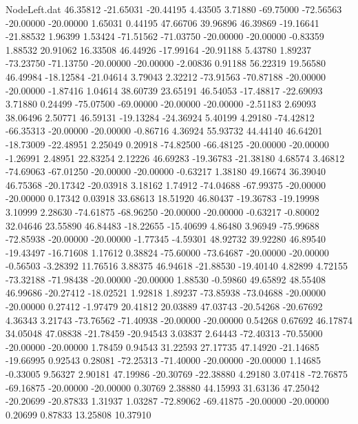 \begin{filecontents}{NodeLeft.dat}
  46.35812  -21.65031  -20.44195     4.43505    3.71880  -69.75000  -72.56563  -20.00000  -20.00000    1.65031    0.44195   47.66706   39.96896
  46.39869  -19.16641  -21.88532     1.96399    1.53424  -71.51562  -71.03750  -20.00000  -20.00000   -0.83359    1.88532   20.91062   16.33508
  46.44926  -17.99164  -20.91188     5.43780    1.89237  -73.23750  -71.13750  -20.00000  -20.00000   -2.00836    0.91188   56.22319   19.56580
  46.49984  -18.12584  -21.04614     3.79043    2.32212  -73.91563  -70.87188  -20.00000  -20.00000   -1.87416    1.04614   38.60739   23.65191
  46.54053  -17.48817  -22.69093     3.71880    0.24499  -75.07500  -69.00000  -20.00000  -20.00000   -2.51183    2.69093   38.06496    2.50771
  46.59131  -19.13284  -24.36924     5.40199    4.29180  -74.42812  -66.35313  -20.00000  -20.00000   -0.86716    4.36924   55.93732   44.44140
  46.64201  -18.73009  -22.48951     2.25049    0.20918  -74.82500  -66.48125  -20.00000  -20.00000   -1.26991    2.48951   22.83254    2.12226
  46.69283  -19.36783  -21.38180     4.68574    3.46812  -74.69063  -67.01250  -20.00000  -20.00000   -0.63217    1.38180   49.16674   36.39040
  46.75368  -20.17342  -20.03918     3.18162    1.74912  -74.04688  -67.99375  -20.00000  -20.00000    0.17342    0.03918   33.68613   18.51920
  46.80437  -19.36783  -19.19998     3.10999    2.28630  -74.61875  -68.96250  -20.00000  -20.00000   -0.63217   -0.80002   32.04646   23.55890
  46.84483  -18.22655  -15.40699     4.86480    3.96949  -75.99688  -72.85938  -20.00000  -20.00000   -1.77345   -4.59301   48.92732   39.92280
  46.89540  -19.43497  -16.71608     1.17612    0.38824  -75.60000  -73.64687  -20.00000  -20.00000   -0.56503   -3.28392   11.76516    3.88375
  46.94618  -21.88530  -19.40140     4.82899    4.72155  -73.32188  -71.98438  -20.00000  -20.00000    1.88530   -0.59860   49.65892   48.55408
  46.99686  -20.27412  -18.02521     1.92818    1.89237  -73.85938  -73.04688  -20.00000  -20.00000    0.27412   -1.97479   20.41812   20.03889
  47.03743  -20.54268  -20.67692     4.36343    3.21743  -73.76562  -71.40938  -20.00000  -20.00000    0.54268    0.67692   46.17874   34.05048
  47.08838  -21.78459  -20.94543     3.03837    2.64443  -72.40313  -70.55000  -20.00000  -20.00000    1.78459    0.94543   31.22593   27.17735
  47.14920  -21.14685  -19.66995     0.92543    0.28081  -72.25313  -71.40000  -20.00000  -20.00000    1.14685   -0.33005    9.56327    2.90181
  47.19986  -20.30769  -22.38880     4.29180    3.07418  -72.76875  -69.16875  -20.00000  -20.00000    0.30769    2.38880   44.15993   31.63136
  47.25042  -20.20699  -20.87833     1.31937    1.03287  -72.89062  -69.41875  -20.00000  -20.00000    0.20699    0.87833   13.25808   10.37910

\end{filecontents}
